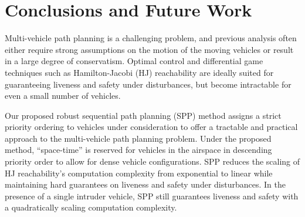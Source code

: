 \section{Conclusions and Future Work}
Multi-vehicle path planning is a challenging problem, and previous analysis often either require strong assumptions on the motion of the moving vehicles or result in a large degree of conservatism. Optimal control and differential game techniques such as Hamilton-Jacobi (HJ) reachability are ideally suited for guaranteeing liveness and safety under disturbances, but become intractable for even a small number of vehicles.

Our proposed robust sequential path planning (SPP) method assigns a strict priority ordering to vehicles under consideration to offer a tractable and practical approach to the multi-vehicle path planning problem. Under the proposed method, ``space-time'' is reserved for vehicles in the airspace in descending priority order to allow for dense vehicle configurations. SPP reduces the scaling of HJ reachability's computation complexity from exponential to linear while maintaining hard guarantees on liveness and safety under disturbances. In the presence of a single intruder vehicle, SPP still guarantees liveness and safety with a quadratically scaling computation complexity.